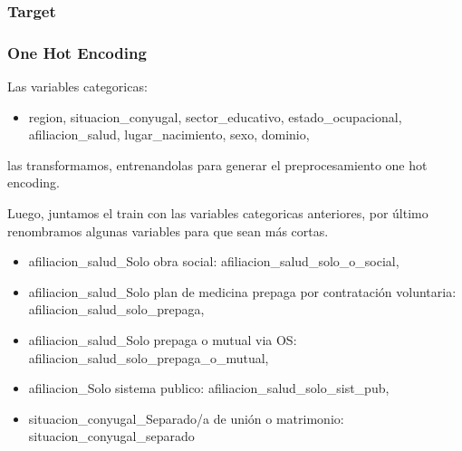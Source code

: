 \documentclass[a4paper]{article}
\begin{document}
        \subsubsection*{Target}

            \subsubsection*{One Hot Encoding}

            Las variables categoricas:
            \begin{itemize}
                \item region, situacion\_conyugal, sector\_educativo, estado\_ocupacional, afiliacion\_salud, lugar\_nacimiento, sexo, dominio,
            \end{itemize}
            las transformamos, entrenandolas para generar el preprocesamiento one hot encoding.
            
            Luego, juntamos el train con las variables categoricas anteriores, por último renombramos algunas variables para que sean más cortas.
            \begin{itemize}
                \item afiliacion\_salud\_Solo obra social: afiliacion\_salud\_solo\_o\_social,
                \item afiliacion\_salud\_Solo plan de medicina prepaga por contratación voluntaria: afiliacion\_salud\_solo\_prepaga,
                \item afiliacion\_salud\_Solo prepaga o mutual via OS: afiliacion\_salud\_solo\_prepaga\_o\_mutual,
                \item afiliacion\_Solo sistema publico: afiliacion\_salud\_solo\_sist\_pub,
                \item situacion\_conyugal\_Separado/a de unión o matrimonio: situacion\_conyugal\_separado
            \end{itemize}
        
\end{document}
